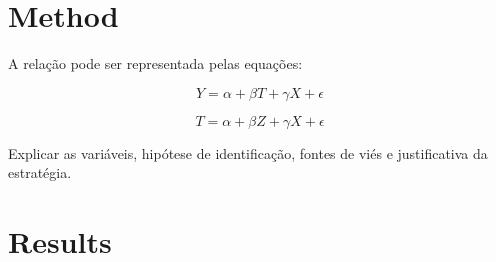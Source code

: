 \documentclass[
  authoryear,
  preprint,
  3p,
  onecolumn]{elsarticle}
\begin{document}
\section{Method}\label{method}

A relação pode ser representada pelas equações:

\[
Y = \alpha + \beta T + \gamma X + \epsilon
\]

\[
T = \alpha + \beta Z + \gamma X + \epsilon
\]

Explicar as variáveis, hipótese de identificação, fontes de viés e
justificativa da estratégia.

\section{Results}\label{results}
\end{document}
